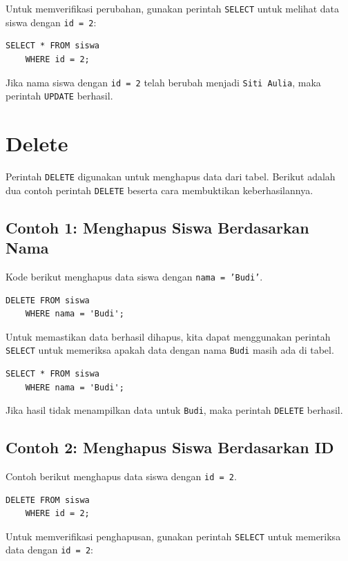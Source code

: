 Untuk memverifikasi perubahan, gunakan perintah \texttt{SELECT} untuk melihat data siswa dengan \texttt{id = 2}:

\begin{lstlisting}[style=sql]
	SELECT * FROM siswa
	WHERE id = 2;
\end{lstlisting}

Jika nama siswa dengan \texttt{id = 2} telah berubah menjadi \texttt{Siti Aulia}, maka perintah \texttt{UPDATE} berhasil.

\section{Delete}

Perintah \texttt{DELETE} digunakan untuk menghapus data dari tabel. Berikut adalah dua contoh perintah \texttt{DELETE} beserta cara membuktikan keberhasilannya.

\subsection*{Contoh 1: Menghapus Siswa Berdasarkan Nama}
Kode berikut menghapus data siswa dengan \texttt{nama = 'Budi'}.

\begin{lstlisting}[style=sql]
	DELETE FROM siswa
	WHERE nama = 'Budi';
\end{lstlisting}

Untuk memastikan data berhasil dihapus, kita dapat menggunakan perintah \texttt{SELECT} untuk memeriksa apakah data dengan nama \texttt{Budi} masih ada di tabel.

\begin{lstlisting}[style=sql]
	SELECT * FROM siswa
	WHERE nama = 'Budi';
\end{lstlisting}

Jika hasil tidak menampilkan data untuk \texttt{Budi}, maka perintah \texttt{DELETE} berhasil.

\subsection*{Contoh 2: Menghapus Siswa Berdasarkan ID}
Contoh berikut menghapus data siswa dengan \texttt{id = 2}.

\begin{lstlisting}[style=sql]
	DELETE FROM siswa
	WHERE id = 2;
\end{lstlisting}

Untuk memverifikasi penghapusan, gunakan perintah \texttt{SELECT} untuk memeriksa data dengan \texttt{id = 2}:

